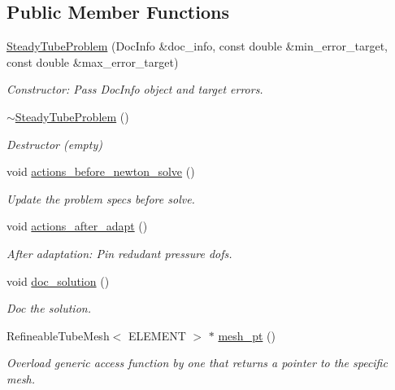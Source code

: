 \subsection*{Public Member Functions}
\begin{DoxyCompactItemize}
\item 
\hyperlink{classSteadyTubeProblem_a333c59fbeb36a2a5cbb170fc34783ec4}{Steady\+Tube\+Problem} (Doc\+Info \&doc\+\_\+info, const double \&min\+\_\+error\+\_\+target, const double \&max\+\_\+error\+\_\+target)
\begin{DoxyCompactList}\small\item\em Constructor\+: Pass Doc\+Info object and target errors. \end{DoxyCompactList}\item 
\hyperlink{classSteadyTubeProblem_a1564d3faf03e6724565097e730d099d5}{$\sim$\+Steady\+Tube\+Problem} ()
\begin{DoxyCompactList}\small\item\em Destructor (empty) \end{DoxyCompactList}\item 
void \hyperlink{classSteadyTubeProblem_a5c5277cac2a887dc6c85892e9f851f97}{actions\+\_\+before\+\_\+newton\+\_\+solve} ()
\begin{DoxyCompactList}\small\item\em Update the problem specs before solve. \end{DoxyCompactList}\item 
void \hyperlink{classSteadyTubeProblem_ae598a2a0ec9bbfb563a1c78aa159561f}{actions\+\_\+after\+\_\+adapt} ()
\begin{DoxyCompactList}\small\item\em After adaptation\+: Pin redudant pressure dofs. \end{DoxyCompactList}\item 
void \hyperlink{classSteadyTubeProblem_ae384d816cf88c86e9f18549701d791f8}{doc\+\_\+solution} ()
\begin{DoxyCompactList}\small\item\em Doc the solution. \end{DoxyCompactList}\item 
Refineable\+Tube\+Mesh$<$ E\+L\+E\+M\+E\+NT $>$ $\ast$ \hyperlink{classSteadyTubeProblem_ac2f2254773b6e20c58a104f9a12efba8}{mesh\+\_\+pt} ()
\begin{DoxyCompactList}\small\item\em Overload generic access function by one that returns a pointer to the specific mesh. \end{DoxyCompactList}\end{DoxyCompactItemize}
